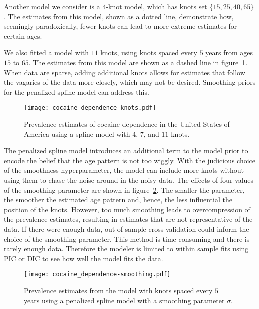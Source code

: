 Another model we consider is a $4$-knot model, which has knots  set $\{15, 25,
40, 65\}$.  The estimates from this model, shown as a dotted line,
demonstrate how, seemingly paradoxically, fewer knots can lead to more
extreme estimates for certain ages.

We also fitted a model with $11$ knots, using knots spaced every $5$ years from
ages $15$ to $65$.
The estimates from this model are shown as a dashed line in
figure~\ref{fig:app-cocaine_knots}.  When data are sparse, adding
additional knots allows for estimates that follow the vagaries of the
data more closely, which may not be desired.  Smoothing priors for the
penalized spline model can address this.

    \begin{figure}[h]
        \begin{center}
            \texttt{[image: cocaine\_dependence-knots.pdf]}
            \caption[Prevalence estimates of cocaine dependence using spline
            models with varying numbers of knots.]{Prevalence estimates of cocaine dependence in the United States of America using a spline model with $4$, $7$, and $11$ knots. }
            \label{fig:app-cocaine_knots}
        \end{center}
    \end{figure}

The penalized spline model introduces an additional term to the model
prior to encode the belief that the age pattern is not too wiggly.
With the judicious choice of the smoothness hyperparameter, the model
can include more knots without using them to chase the noise around in
the noisy data.  The effects of four values of the smoothing parameter
are shown in figure~\ref{fig:app-cocaine_smoothing}.  The smaller the
parameter, the smoother the estimated age pattern and, hence, the less
influential the position of the knots.  However, too much smoothing
leads to overcompression of the prevalence estimates, resulting in estimates
that are not representative of the data.  If there were enough data,
out-of-sample cross validation could inform the choice of the smoothing
parameter.  This method is time consuming and there is rarely
enough data.  Therefore the modeler is limited to within sample fits
using PIC or DIC to see how well the model fits the data.

    \begin{figure}[h]
        \begin{center}
            \texttt{[image: cocaine\_dependence-smoothing.pdf]}
            \caption[Prevalence estimates of cocaine dependence using a
              smoothing parameter.]{Prevalence estimates from the model
              with knots spaced every $5$ years
              using a penalized spline model with a smoothing
              parameter $\sigma$. }
        \label{fig:app-cocaine_smoothing}
        \end{center}
    \end{figure}

